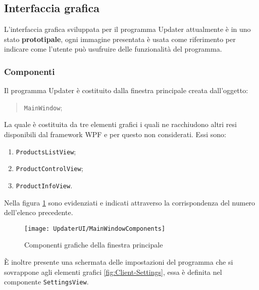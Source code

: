 \documentclass[../RelazioneFinale.tex]{subfiles}
\begin{document}
		\subsection{Interfaccia grafica}
		\label{subsec:InterfacciaGrafica}
			L'interfaccia grafica sviluppata per il programma Updater attualmente è in uno stato \textbf{prototipale}, ogni immagine presentata è usata come riferimento per indicare come l'utente può usufruire delle funzionalità del programma.
			
			\subsubsection{Componenti}
			Il programma Updater è costituito dalla finestra principale creata dall'oggetto:
			\begin{quote}
				 \verb|MainWindow|;
			\end{quote}
			La quale è costituita da tre elementi grafici i quali ne racchiudono altri resi disponibili dal framework WPF e per questo non considerati. Essi sono:
			\begin{enumerate}
				\item \verb|ProductsListView|;
				\item \verb|ProductControlView|;
				\item \verb|ProductInfoView|.
			\end{enumerate}
			Nella figura \ref{fig:MainWindowComponents} sono evidenziati e indicati attraverso la corrispondenza del numero dell'elenco precedente.
			
			\begin{figure}[h]
				\texttt{[image: UpdaterUI/MainWindowComponents]}
				\caption{Componenti grafiche della finestra principale}
				\label{fig:MainWindowComponents}
			\end{figure}
			
			È inoltre presente una schermata delle impostazioni del programma che si sovrappone agli elementi grafici \ref{fig:Client-Settings}, essa è definita nel componente \verb|SettingsView|.
			
\newpage
\end{document}
